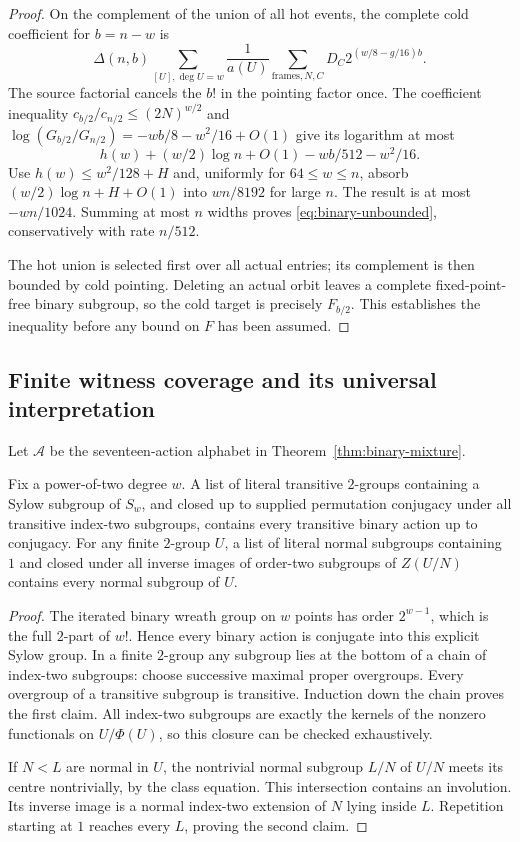 \begin{proof}
On the complement of the union of all hot events, the complete cold
coefficient for $b=n-w$ is
\[
 \Delta(n,b)\sum_{[U],\deg U=w}\frac1{a(U)}
       \sum_{\text{frames},N,C}D_C2^{(w/8-g/16)b}.
\]
The source factorial cancels the $b!$ in the pointing factor once.
The coefficient inequality $c_{b/2}/c_{n/2}\leq(2N)^{w/2}$ and
$\log(G_{b/2}/G_{n/2})=-wb/8-w^2/16+O(1)$ give its logarithm at most
\[
 h(w)+(w/2)\log n+O(1)-wb/512-w^2/16.
\]
Use $h(w)\leq w^2/128+H$ and, uniformly for $64\leq w\leq n$,
absorb $(w/2)\log n+H+O(1)$ into $wn/8192$ for large $n$.
The result is at most $-wn/1024$. Summing at most $n$ widths proves
\eqref{eq:binary-unbounded}, conservatively with rate $n/512$.

The hot union is selected first over all actual entries; its complement
is then bounded by cold pointing. Deleting an actual orbit leaves a
complete fixed-point-free binary subgroup, so the cold target is
precisely $F_{b/2}$. This establishes the inequality before any bound
on $F$ has been assumed.
\end{proof}

\subsection{Finite witness coverage and its universal interpretation}
Let $\mathcal A$ be the seventeen-action alphabet in
Theorem~\ref{thm:binary-mixture}.

\begin{lemma}\label{lem:binary-coverage}
Fix a power-of-two degree $w$. A list of literal transitive $2$-groups
containing a Sylow subgroup of $S_w$, and closed up to supplied
permutation conjugacy under all transitive index-two subgroups,
contains every transitive binary action up to conjugacy.
For any finite $2$-group $U$, a list of literal normal subgroups
containing $1$ and closed under all inverse images of order-two
subgroups of $Z(U/N)$ contains every normal subgroup of $U$.
\end{lemma}
\begin{proof}
The iterated binary wreath group on $w$ points has order $2^{w-1}$,
which is the full $2$-part of $w!$. Hence every binary action is
conjugate into this explicit Sylow group. In a finite $2$-group any
subgroup lies at the bottom of a chain of index-two subgroups: choose
successive maximal proper overgroups. Every overgroup of a transitive
subgroup is transitive. Induction down the chain proves the first claim.
All index-two subgroups are exactly the kernels of the nonzero
functionals on $U/\Phi(U)$, so this closure can be checked exhaustively.

If $N<L$ are normal in $U$, the nontrivial normal subgroup $L/N$ of
$U/N$ meets its centre nontrivially, by the class equation. This
intersection contains an involution. Its inverse image is a normal
index-two extension of $N$ lying inside $L$. Repetition starting at
$1$ reaches every $L$, proving the second claim.
\end{proof}

